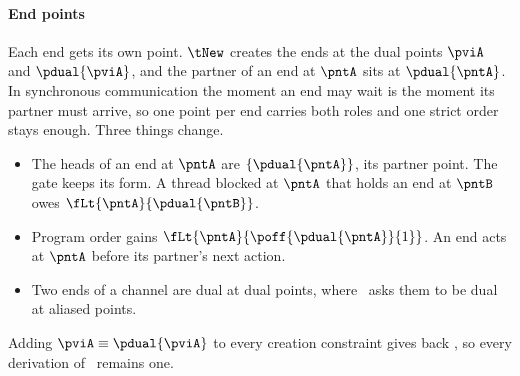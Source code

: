 \paragraph{End points}
Each end gets its own point. $\tNew$ creates the ends at the dual points
$\pviA$ and $\pdual{\pviA}$, and the partner of an end at $\pntA$ sits at
$\pdual{\pntA}$. In synchronous communication the moment an end may wait
is the moment its partner must arrive, so one point per end carries both
roles and one strict order stays enough. Three things change.
\begin{itemize}
  \item The heads of an end at $\pntA$ are $\set{\pdual{\pntA}}$, its
        partner point. The gate keeps its form. A thread blocked at
        $\pntA$ that holds an end at $\pntB$ owes
        $\fLt{\pntA}{\pdual{\pntB}}$.
  \item Program order gains $\fLt{\pntA}{\poff{\pdual{\pntA}}{1}}$. An
        end acts at $\pntA$ before its partner's next action.
  \item Two ends of a channel are dual at dual points, where \OurLang\
        asks them to be dual at aliased points.
\end{itemize}
Adding $\pviA \equiv \pdual{\pviA}$ to every creation constraint gives
back \OurLang, so every derivation of \OurLang\ remains one.

